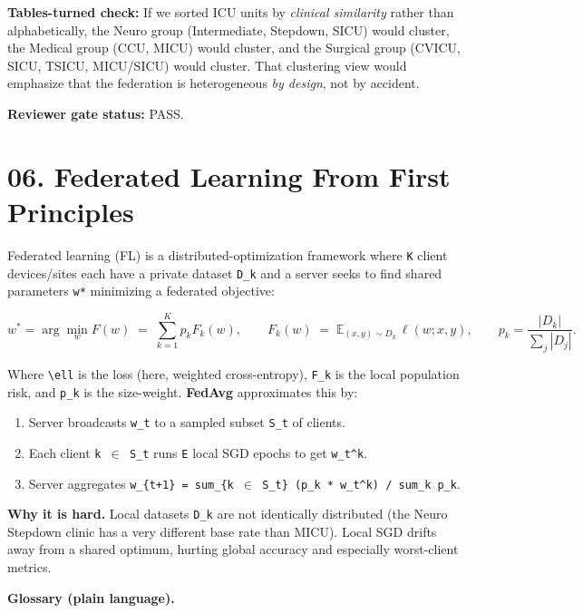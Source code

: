 \documentclass{article}
\begin{document}
\textbf{Tables-turned check:} If we sorted ICU units by \emph{clinical similarity} rather than alphabetically, the Neuro group (Intermediate, Stepdown, SICU) would cluster, the Medical group (CCU, MICU) would cluster, and the Surgical group (CVICU, SICU, TSICU, MICU/SICU) would cluster. That clustering view would emphasize that the federation is heterogeneous \emph{by design}, not by accident.


\textbf{Reviewer gate status:} PASS.



\clearpage
\section{06. Federated Learning From First Principles}


Federated learning (FL) is a distributed-optimization framework where \texttt{K} client devices/sites each have a private dataset \texttt{D\_k} and a server seeks to find shared parameters \texttt{w*} minimizing a federated objective:


\[ w^* = \arg\min_w F(w) \;=\; \sum_{k=1}^K p_k F_k(w), \qquad F_k(w) \;=\; \mathbb{E}_{(x,y)\sim D_k}\,\ell(w; x, y), \qquad p_k = \frac{|D_k|}{\sum_j |D_j|}. \]


Where \texttt{\textbackslash{}ell} is the loss (here, weighted cross-entropy), \texttt{F\_k} is the local population risk, and \texttt{p\_k} is the size-weight. \textbf{FedAvg} approximates this by:


\begin{enumerate}[leftmargin=1.4em,itemsep=2pt,topsep=2pt]
  \item Server broadcasts \texttt{w\_t} to a sampled subset \texttt{S\_t} of clients.
  \item Each client \texttt{k \ensuremath{\in} S\_t} runs \texttt{E} local SGD epochs to get \texttt{w\_t\textasciicircum{}k}.
  \item Server aggregates \texttt{w\_\{t+1\} = sum\_\{k \ensuremath{\in} S\_t\} (p\_k * w\_t\textasciicircum{}k) / sum\_k p\_k}.
\end{enumerate}


\textbf{Why it is hard.} Local datasets \texttt{D\_k} are not identically distributed (the Neuro Stepdown clinic has a very different base rate than MICU). Local SGD drifts away from a shared optimum, hurting global accuracy and especially worst-client metrics.


\textbf{Glossary (plain language).}
\end{document}
